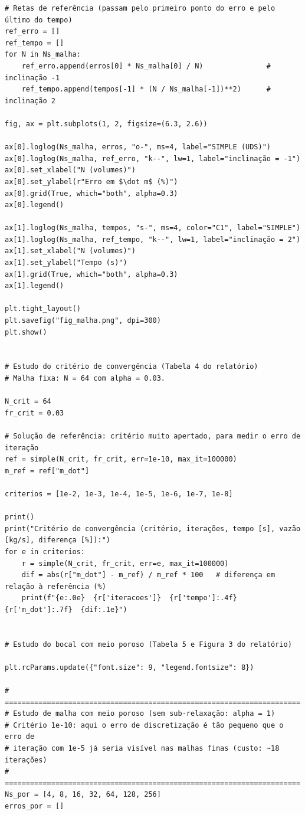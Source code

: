 {\begin{verbatim}
# Retas de referência (passam pelo primeiro ponto do erro e pelo último do tempo)
ref_erro = []
ref_tempo = []
for N in Ns_malha:
    ref_erro.append(erros[0] * Ns_malha[0] / N)               # inclinação -1
    ref_tempo.append(tempos[-1] * (N / Ns_malha[-1])**2)      # inclinação 2

fig, ax = plt.subplots(1, 2, figsize=(6.3, 2.6))

ax[0].loglog(Ns_malha, erros, "o-", ms=4, label="SIMPLE (UDS)")
ax[0].loglog(Ns_malha, ref_erro, "k--", lw=1, label="inclinação = -1")
ax[0].set_xlabel("N (volumes)")
ax[0].set_ylabel(r"Erro em $\dot m$ (%)")
ax[0].grid(True, which="both", alpha=0.3)
ax[0].legend()

ax[1].loglog(Ns_malha, tempos, "s-", ms=4, color="C1", label="SIMPLE")
ax[1].loglog(Ns_malha, ref_tempo, "k--", lw=1, label="inclinação = 2")
ax[1].set_xlabel("N (volumes)")
ax[1].set_ylabel("Tempo (s)")
ax[1].grid(True, which="both", alpha=0.3)
ax[1].legend()

plt.tight_layout()
plt.savefig("fig_malha.png", dpi=300)
plt.show()


# Estudo do critério de convergência (Tabela 4 do relatório)
# Malha fixa: N = 64 com alpha = 0.03.

N_crit = 64
fr_crit = 0.03

# Solução de referência: critério muito apertado, para medir o erro de iteração
ref = simple(N_crit, fr_crit, err=1e-10, max_it=100000)
m_ref = ref["m_dot"]

criterios = [1e-2, 1e-3, 1e-4, 1e-5, 1e-6, 1e-7, 1e-8]

print()
print("Critério de convergência (critério, iterações, tempo [s], vazão [kg/s], diferença [%]):")
for e in criterios:
    r = simple(N_crit, fr_crit, err=e, max_it=100000)
    dif = abs(r["m_dot"] - m_ref) / m_ref * 100   # diferença em relação à referência (%)
    print(f"{e:.0e}  {r['iteracoes']}  {r['tempo']:.4f}  {r['m_dot']:.7f}  {dif:.1e}")


# Estudo do bocal com meio poroso (Tabela 5 e Figura 3 do relatório)

plt.rcParams.update({"font.size": 9, "legend.fontsize": 8})

# ======================================================================
# Estudo de malha com meio poroso (sem sub-relaxação: alpha = 1)
# Critério 1e-10: aqui o erro de discretização é tão pequeno que o erro de
# iteração com 1e-5 já seria visível nas malhas finas (custo: ~18 iterações)
# ======================================================================
Ns_por = [4, 8, 16, 32, 64, 128, 256]
erros_por = []


\end{verbatim}}
